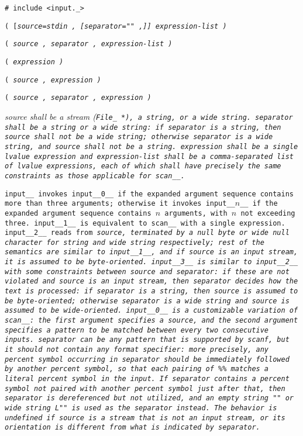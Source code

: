 
\tt{# include <input._>}

\s\s\s\s\tt{(} [\it{source}\tt{=stdin} \tt{,}
[\it{separator}\tt{=""} \tt{,}]] \it{expression-list} \tt{)}

\s\tt{(} \it{source} \tt{,}
\it{separator} \tt{,} \it{expression-list} \tt{)}

\s\tt{(} \it{expression} \tt{)}

\s\tt{(} \it{source} \tt{,} \it{expression} \tt{)}

\s\tt{(} \it{source} \tt{,} \it{separator} \tt{,} \it{expression} \tt{)}


\it{source} shall be a stream (\tt{File_ *}), a string, or a wide string.
\it{separator} shall be a string or a wide string:
if \it{separator} is a string, then \it{source} shall not be a wide string;
otherwise \it{separator} is a wide string, and \it{source} shall not be a string.
\it{expression} shall be a single lvalue expression and \it{expression-list}
shall be a comma-separated list of lvalue expressions, each of which shall
have precisely the same constraints as those applicable for \tt{scan__}.


\tt{input__} invokes \tt{input__0__} if the expanded argument sequence contains
more than three arguments; otherwise it invokes \tt{input__}$n$\tt{__} if the
expanded argument sequence contains $n$ arguments, with $n$ not exceeding three.
\tt{input__1__} is equivalent to \tt{scan__} with a single expression.
\tt{input__2__} reads from \it{source}, terminated by a null byte
or wide null character for string and wide string respectively;
rest of the semantics are similar to \tt{input__1__},
and if \it{source} is an input stream, it is assumed to be byte-oriented.
\tt{input__3__} is similar to \tt{input__2__} with some constraints between
\it{source} and \it{separator}: if these are not violated and \it{source}
is an input stream, then \it{separator} decides how the text is processed:
if \it{separator} is a string, then \it{source} is assumed to be byte-oriented;
otherwise \it{separator} is a wide string and
\it{source} is assumed to be wide-oriented.
\tt{input__0__} is a customizable variation of \tt{scan__}:
the first argument specifies a \it{source}, and the second argument
specifies a pattern to be matched between every two consecutive inputs.
\it{separator} can be any pattern that is supported by \tt{scanf}, but it should
not contain any format specifier: more precisely, any percent symbol occurring
in \it{separator} should be immediately followed by another percent symbol, so
that each pairing of \tt{\%\%} matches a literal percent symbol in the input.
If \it{separator} contains a percent symbol not paired with another percent
symbol just after that, then \it{separator} is dereferenced but not utilized, and
an empty string \tt{""} or wide string \tt{L""} is used as the separator instead.
The behavior is undefined if \it{source} is a stream that is not an input stream,
or its orientation is different from what is indicated by \it{separator}.

